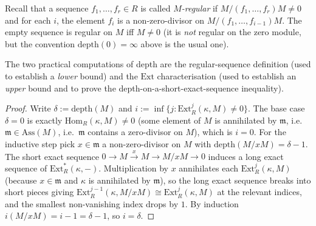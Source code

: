 Recall that a sequence \(f_1, \dots, f_r \in R\) is called \emph{\(M\)-regular} if
\(M/(f_1, \dots, f_r)M \neq 0\) and for each \(i\), the element \(f_i\) is a non-zero-divisor on
\(M/(f_1, \dots, f_{i-1})M\). The empty sequence is regular on \(M\) iff \(M \neq 0\) (it is
\emph{not} regular on the zero module, but the convention \(\text{depth}(0) = \infty\)
above is the usual one).

The two practical computations of depth are the regular-sequence definition (used to
establish a \emph{lower} bound) and the \(\text{Ext}\) characterisation (used to establish an
\emph{upper} bound and to prove the depth-on-a-short-exact-sequence inequality).


\begin{proof}
  
  
\leanok
  Write \(\delta := \text{depth}(M)\) and \(i := \inf\{ j : \text{Ext}^j_R(\kappa, M) \neq 0 \}\).
  The base case \(\delta = 0\) is exactly \(\text{Hom}_R(\kappa, M) \neq 0\) (some element of
  \(M\) is annihilated by \(\mathfrak{m}\), i.e.\ \(\mathfrak{m} \in \text{Ass}(M)\), i.e.\
  \(\mathfrak{m}\) contains a zero-divisor on \(M\)), which is \(i = 0\). For the inductive step
  pick \(x \in \mathfrak{m}\) a non-zero-divisor on \(M\) with
  \(\text{depth}(M/xM) = \delta - 1\). The short exact sequence
  \(0 \to M \xrightarrow{x} M \to M/xM \to 0\) induces a long exact sequence of \(\text{Ext}^*_R(\kappa,
  -)\). Multiplication by \(x\) annihilates each \(\text{Ext}^j_R(\kappa, M)\) (because
  \(x \in \mathfrak{m}\) and \(\kappa\) is annihilated by \(\mathfrak{m}\)), so the long exact
  sequence breaks into short pieces giving
  \(\text{Ext}^{j-1}_R(\kappa, M/xM) \cong \text{Ext}^j_R(\kappa, M)\) at the relevant
  indices, and the smallest non-vanishing index drops by \(1\). By induction
  \(i(M/xM) = i - 1 = \delta - 1\), so \(i = \delta\).
\end{proof}

